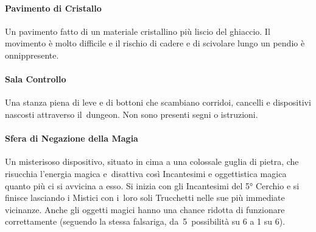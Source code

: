 \documentclass[itdr]{subfiles}
\begin{document}
\vfill
\paragraph{Pavimento di Cristallo}
Un pavimento fatto di un materiale cristallino più liscio del ghiaccio. Il movimento è molto difficile e il rischio di cadere e di scivolare lungo un pendio è onnippresente.

\vfill
\paragraph{Sala Controllo}
Una stanza piena di leve e di bottoni che scambiano corridoi, cancelli e dispositivi nascosti attraverso il~dungeon. Non sono presenti segni o istruzioni.

\vfill
\paragraph{Sfera di Negazione della Magia}
Un misterisoso dispositivo, situato in cima a una colossale guglia di pietra, che risucchia l'energia magica e~disattiva così Incantesimi e oggettistica magica quanto più ci si avvicina a esso. Si inizia con gli Incantesimi del 5° Cerchio e si finisce lasciando i Mistici con i~loro soli Trucchetti nelle sue più immediate vicinanze. Anche gli oggetti magici hanno una chance ridotta di funzionare correttamente (seguendo la stessa falsariga, da~5~possibilità su 6 a 1 su 6).

\vfill
\end{document}
